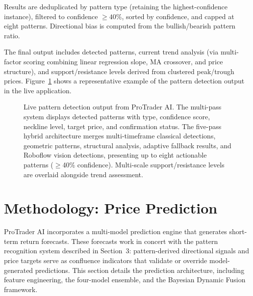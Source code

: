 \documentclass[12pt,a4paper]{article}
\begin{document}
Results are deduplicated by pattern type (retaining the highest-confidence instance), filtered to confidence $\geq 40\%$, sorted by confidence, and capped at eight patterns. Directional bias is computed from the bullish/bearish pattern ratio.

The final output includes detected patterns, current trend analysis (via multi-factor scoring combining linear regression slope, MA crossover, and price structure), and support/resistance levels derived from clustered peak/trough prices. Figure~\ref{fig:app_pattern_detection} shows a representative example of the pattern detection output in the live application.

\begin{figure}[H]
    \centering
    \caption{Live pattern detection output from ProTrader AI. The multi-pass system displays detected patterns with type, confidence score, neckline level, target price, and confirmation status. The five-pass hybrid architecture merges multi-timeframe classical detections, geometric patterns, structural analysis, adaptive fallback results, and Roboflow vision detections, presenting up to eight actionable patterns ($\geq$40\% confidence). Multi-scale support/resistance levels are overlaid alongside trend assessment.}
    \label{fig:app_pattern_detection}
\end{figure}

\section{Methodology: Price Prediction}

ProTrader AI incorporates a multi-model prediction engine that generates short-term return forecasts. These forecasts work in concert with the pattern recognition system described in Section~3: pattern-derived directional signals and price targets serve as confluence indicators that validate or override model-generated predictions. This section details the prediction architecture, including feature engineering, the four-model ensemble, and the Bayesian Dynamic Fusion framework.
\end{document}
